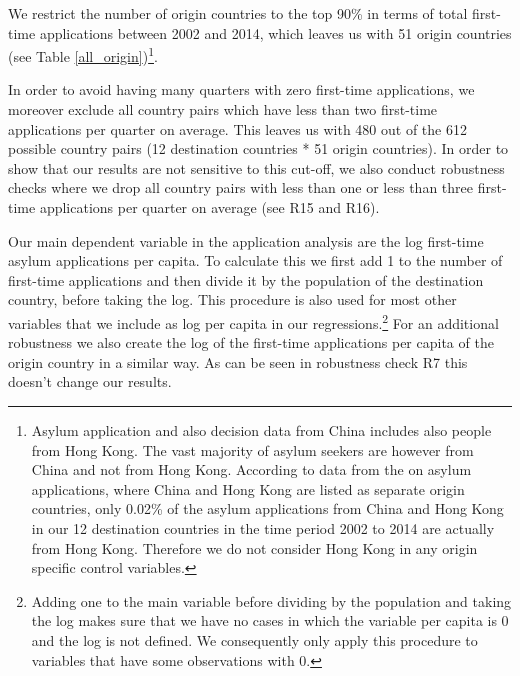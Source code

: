 \documentclass[11pt,a4paper]{scrartcl}
\begin{document}
We restrict the number of origin countries to the top 90\% in terms of total first-time applications between 2002 and 2014, which leaves us with 51 origin countries (see Table \ref{all_origin})\footnote{Asylum application and also decision data from China includes also people from Hong Kong. The vast majority of asylum seekers are however from China and not from Hong Kong. According to data from the \textcite{UNHCR2017} on asylum applications, where China and Hong Kong are listed as separate origin countries, only 0.02\% of the asylum applications from China and Hong Kong in our 12 destination countries in the time period 2002 to 2014 are actually from Hong Kong. Therefore we do not consider Hong Kong in any origin specific control variables.}. 

In order to avoid having many quarters with zero first-time applications, we moreover exclude all country pairs which have less than two first-time applications per quarter on average. This leaves us with 480 out of the 612 possible country pairs (12 destination countries * 51 origin countries). In order to show that our results are not sensitive to this cut-off, we also conduct robustness checks where we drop all country pairs with less than one or less than three first-time applications per quarter on average (see R15 and R16).

Our main dependent variable in the application analysis are the log first-time asylum applications per capita. To calculate this we first add 1 to the number of first-time applications and then divide it by the population of the destination country, before taking the log. This procedure is also used for most other variables that we include as log per capita in our regressions.\footnote{Adding one to the main variable before dividing by the population and taking the log makes sure that we have no cases in which the variable per capita is 0 and the log is not defined. We consequently only apply this procedure to variables that have some observations with 0.} For an additional robustness we also create the log of the first-time applications per capita of the origin country in a similar way. As can be seen in robustness check R7 this doesn't change our results.
\end{document}
